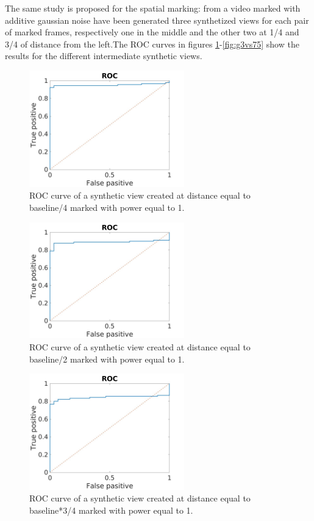 The same study is proposed for the spatial marking: from a video marked with additive gaussian noise have been generated three synthetized views for each pair of marked frames, respectively one in the middle and the other two at 1/4 and 3/4 of distance from the left.\newline The ROC curves in figures \ref{fig:g1vs25}-\ref{fig:g3vs75}  show the results for the different intermediate synthetic views.\newline 
\begin{figure}[h!]
\centering
\includegraphics[width=0.6\textwidth]{./img/ROC/ROC_gauss_synt_1_25.jpg}
\caption{\small{ROC curve of a synthetic view created at distance equal to baseline/4 marked with power equal to 1. }}
\label{fig:g1vs25}
\end{figure}
\begin{figure}[h!]
\centering
\includegraphics[width=0.6\textwidth]{./img/ROC/ROC_gauss_synt_1_50.jpg}
\caption{\small{ROC curve of a synthetic view created at distance equal to baseline/2 marked with power equal to 1. }}
\label{fig:g1vs50}
\end{figure}
\begin{figure}[h!]
\centering
\includegraphics[width=0.6\textwidth]{./img/ROC/ROC_gauss_synt_1_75.jpg}
\caption{\small{ROC curve of a synthetic view created at distance equal to baseline*3/4 marked with power equal to 1. }}
\label{fig:g1vs75}
\end{figure}
